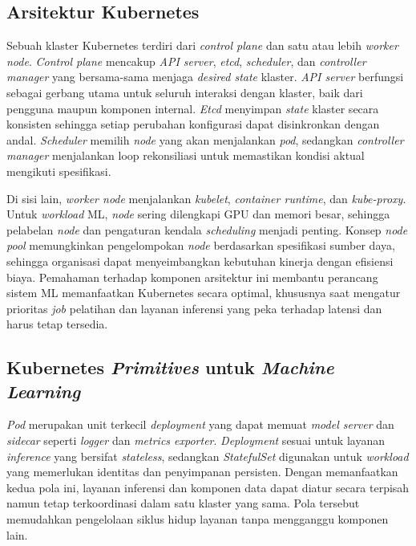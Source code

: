 \subsection{Arsitektur Kubernetes}

Sebuah klaster Kubernetes terdiri dari \textit{control plane} dan satu atau lebih \textit{worker node}. \textit{Control plane} mencakup \textit{API server}, \textit{etcd}, \textit{scheduler}, dan \textit{controller manager} yang bersama-sama menjaga \textit{desired state} klaster. \textit{API server} berfungsi sebagai gerbang utama untuk seluruh interaksi dengan klaster, baik dari pengguna maupun komponen internal. \textit{Etcd} menyimpan \textit{state} klaster secara konsisten sehingga setiap perubahan konfigurasi dapat disinkronkan dengan andal. \textit{Scheduler} memilih \textit{node} yang akan menjalankan \textit{pod}, sedangkan \textit{controller manager} menjalankan loop rekonsiliasi untuk memastikan kondisi aktual mengikuti spesifikasi.

Di sisi lain, \textit{worker node} menjalankan \textit{kubelet}, \textit{container runtime}, dan \textit{kube-proxy}. Untuk \textit{workload} ML, \textit{node} sering dilengkapi GPU dan memori besar, sehingga pelabelan \textit{node} dan pengaturan kendala \textit{scheduling} menjadi penting. Konsep \textit{node pool} memungkinkan pengelompokan \textit{node} berdasarkan spesifikasi sumber daya, sehingga organisasi dapat menyeimbangkan kebutuhan kinerja dengan efisiensi biaya. Pemahaman terhadap komponen arsitektur ini membantu perancang sistem ML memanfaatkan Kubernetes secara optimal, khususnya saat mengatur prioritas \textit{job} pelatihan dan layanan inferensi yang peka terhadap latensi dan harus tetap tersedia.

\subsection{Kubernetes \textit{Primitives} untuk \textit{Machine Learning}}

\textit{Pod} merupakan unit terkecil \textit{deployment} yang dapat memuat \textit{model server} dan \textit{sidecar} seperti \textit{logger} dan \textit{metrics exporter}. \textit{Deployment} sesuai untuk layanan \textit{inference} yang bersifat \textit{stateless}, sedangkan \textit{StatefulSet} digunakan untuk \textit{workload} yang memerlukan identitas dan penyimpanan persisten. Dengan memanfaatkan kedua pola ini, layanan inferensi dan komponen data dapat diatur secara terpisah namun tetap terkoordinasi dalam satu klaster yang sama. Pola tersebut memudahkan pengelolaan siklus hidup layanan tanpa mengganggu komponen lain.

